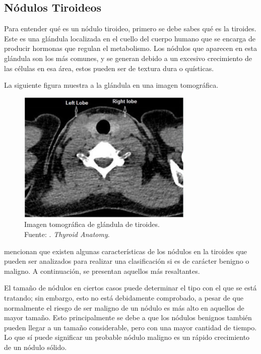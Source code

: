 \subsection{Nódulos Tiroideos}
Para entender qué es un nódulo tiroideo, primero se debe sabes qué es la tiroides. Este es una glándula localizada en el cuello del cuerpo humano que se encarga de producir hormonas que regulan el metabolismo. Los nódulos que aparecen en esta glándula son los más comunes, y se generan debido a un excesivo crecimiento de las células en esa área, estos pueden ser de textura dura o quísticas. \parencite{pr_deng2022autclass}

La siguiente figura muestra a la glándula en una imagen tomográfica.

\begin{figure}[H]
	\begin{center}
		\includegraphics[width=0.75\textwidth]{2/figures/gland_thyroid.png}
		\caption[Imagen tomográfica de glándula de tiroides]{Imagen tomográfica de glándula de tiroides. \\
		Fuente: \cite{pr_binboga2019thyroid}. \textit{Thyroid Anatomy}.}
		\label{2:fig206}
	\end{center}
\end{figure}

\cite{pr_shin2016ultradiag} mencionan que existen algunas características de los nódulos en la tiroides que pueden ser analizados para realizar una clasificación si es de carácter benigno o maligno. A continuación, se presentan aquellos más resaltantes.

El tamaño de nódulos en ciertos casos puede determinar el tipo con el que se está tratando; sin embargo, esto no está debidamente comprobado, a pesar de que normalmente el riesgo de ser maligno de un nódulo es más alto en aquellos de mayor tamaño. Esto principalmente se debe a que los nódulos benignos también pueden llegar a un tamaño considerable, pero con una mayor cantidad de tiempo. Lo que sí puede significar un probable nódulo maligno es un rápido crecimiento de un nódulo sólido.

